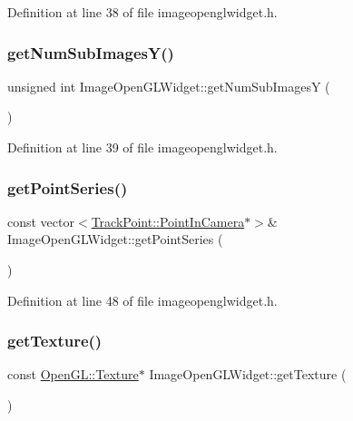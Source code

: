 Definition at line 38 of file imageopenglwidget.\+h.

\mbox{\label{class_image_open_g_l_widget_a50933016b069d25455cbd0e86862c645}} 
\subsubsection{\texorpdfstring{getNumSubImagesY()}{getNumSubImagesY()}}
{\footnotesize\ttfamily unsigned int Image\+Open\+G\+L\+Widget\+::get\+Num\+Sub\+ImagesY (\begin{DoxyParamCaption}{ }\end{DoxyParamCaption})\hspace{0.3cm}{\ttfamily [inline]}}



Definition at line 39 of file imageopenglwidget.\+h.

\mbox{\label{class_image_open_g_l_widget_aecdc8b3f3d6f614a863ded3c6fae03a8}} 
\subsubsection{\texorpdfstring{getPointSeries()}{getPointSeries()}}
{\footnotesize\ttfamily const vector$<$\mbox{\hyperlink{struct_track_point_1_1_point_in_camera}{Track\+Point\+::\+Point\+In\+Camera}}$\ast$$>$\& Image\+Open\+G\+L\+Widget\+::get\+Point\+Series (\begin{DoxyParamCaption}{ }\end{DoxyParamCaption})\hspace{0.3cm}{\ttfamily [inline]}}



Definition at line 48 of file imageopenglwidget.\+h.

\mbox{\label{class_image_open_g_l_widget_ae48d37d074944ab505eb3d9b3a8a7cb8}} 
\subsubsection{\texorpdfstring{getTexture()}{getTexture()}}
{\footnotesize\ttfamily const \mbox{\hyperlink{class_open_g_l_1_1_texture}{Open\+G\+L\+::\+Texture}}$\ast$ Image\+Open\+G\+L\+Widget\+::get\+Texture (\begin{DoxyParamCaption}{ }\end{DoxyParamCaption})\hspace{0.3cm}{\ttfamily [inline]}}



